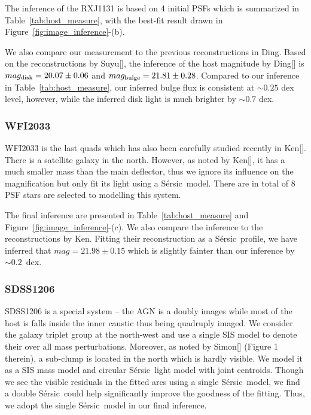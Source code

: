 \documentclass[fleqn,usenatbib]{mnras}
\newcommand{\sersic}{S\'ersic}
\begin{document}
The inference of the RXJ1131 is based on 4 initial PSFs which is summarized in Table~\ref{tab:host_measure}, with the best-fit result drawn in Figure~\ref{fig:image_inference}-(b).

We also compare our measurement to the previous reconstructions in Ding. Based on the reconstructions by Suyu[], the inference of the host magnitude by Ding[] is $mag_{\rm disk} = 20.07\pm0.06$ and $mag_{\rm bulge} = 21.81 \pm 0.28$. Compared to our inference in Table~\ref{tab:host_measure}, our inferred bulge flux is consistent at $\sim0.25$ dex level, however, while the inferred disk light is much brighter by $\sim 0.7$ dex.

\subsubsection{WFI2033}
WFI2033 is the last quads which has also been carefully studied recently in Ken[]. There is a satellite galaxy in the north. However, as noted by Ken[], it has a much smaller mass than the main deflector, thus we ignore its influence on the magnification but only fit its light using a \sersic\ model. There are in total of 8 PSF stars are selected to modelling this system.

The final inference are presented in Table~\ref{tab:host_measure} and Figure~\ref{fig:image_inference}-(c). We also compare the inference to the reconstructions by Ken. Fitting their reconstruction as a \sersic\ profile, we have inferred that $mag = 21.98 \pm 0.15$ which is slightly fainter than our inference by $\sim0.2$~dex.

\subsubsection{SDSS1206}
SDSS1206 is a special system -- the AGN is a doubly images while most of the host is falls inside the inner caustic thus being quadruply imaged. We consider the galaxy triplet group at the north-west and use a single SIS model to denote their over all mass perturbations. Moreover, as noted by Simon[] (Figure 1 therein), a sub-clump is located in the north which is hardly visible. We model it as a SIS mass model and circular \sersic\ light model with joint centroids. Though we see the visible residuals in the fitted arcs using a single \sersic\ model, we find a double \sersic\ could help significantly improve the goodness of the fitting. Thus, we adopt the single \sersic\ model in our final inference. 
\end{document}
